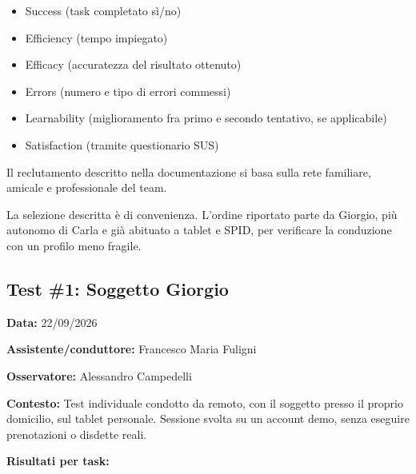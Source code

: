
\begin{itemize}
\item
  Success (task completato sì/no)
\item
  Efficiency (tempo impiegato)
\item
  Efficacy (accuratezza del risultato ottenuto)
\item
  Errors (numero e tipo di errori commessi)
\item
  Learnability (miglioramento fra primo e secondo tentativo, se
  applicabile)
\item
  Satisfaction (tramite questionario SUS)
\end{itemize}


Il reclutamento descritto nella documentazione si basa sulla rete familiare,
amicale e professionale del team.


La selezione descritta è di convenienza. L'ordine riportato parte da
Giorgio, più autonomo di Carla e già abituato a tablet e SPID, per verificare
la conduzione con un profilo meno fragile.

\subsection{Test \#1: Soggetto Giorgio}

\textbf{Data:} 22/09/2026

\textbf{Assistente/conduttore:} Francesco Maria Fuligni

\textbf{Osservatore:} Alessandro Campedelli

\textbf{Contesto:} Test individuale condotto da remoto, con il
soggetto presso il proprio domicilio, sul tablet personale. Sessione
svolta su un account demo, senza eseguire prenotazioni o disdette
reali.

\textbf{Risultati per task:}

